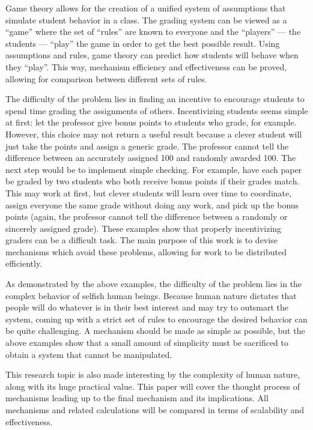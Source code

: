 \documentclass[12pt, Arial]{article}
\begin{document}
Game theory allows for the creation of a unified system of assumptions that simulate student behavior in a class. The grading system can be viewed as a ``game'' where the set of ``rules'' are known to everyone and the ``players'' --- the students --- ``play'' the game in order to get the best possible result. Using assumptions and rules, game theory can predict how students will behave when they ``play''. This way, mechanism efficiency and effectiveness can be proved, allowing for comparison between different sets of rules.

The difficulty of the problem lies in finding an incentive to encourage students to spend time grading the assignments of others. Incentivizing students seems simple at first: let the professor give bonus points to students who grade, for example. However, this choice may not return a useful result because a clever student will just take the points and assign a generic grade. The professor cannot tell the difference between an accurately assigned 100 and randomly awarded 100. The next step would be to implement simple checking. For example, have each paper be graded by two students who both receive bonus points if their grades match. This may work at first, but clever students will learn over time to coordinate, assign everyone the same grade without doing any work, and pick up the bonus points (again, the professor cannot tell the difference between a randomly or sincerely assigned grade). These examples show that properly incentivizing graders can be a difficult task. The main purpose of this work is to devise mechanisms which avoid these problems, allowing for work to be distributed efficiently.

As demonstrated by the above examples, the difficulty of the problem lies in the complex behavior of selfish human beings. Because human nature dictates that people will do whatever is in their best interest and may try to outsmart the system, coming up with a strict set of rules to encourage the desired behavior can be quite challenging. A mechanism should be made as simple as possible, but the above examples show that a small amount of simplicity must be sacrificed to obtain a system that cannot be manipulated.

This research topic is also made interesting by the complexity of human nature, along with its huge practical value. This paper will cover the thought process of mechanisms leading up to the final mechanism and its implications. All mechanisms and related calculations will be compared in terms of scalability and effectiveness.
\end{document}
